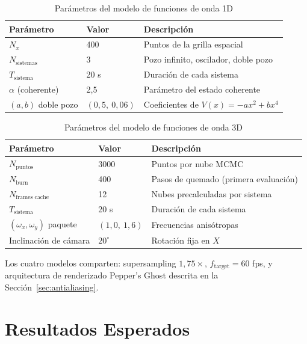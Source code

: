\documentclass[12pt, a4paper]{article}
\begin{document}
\begin{table}[H]
  \centering
  \caption{Parámetros del modelo de funciones de onda 1D}
  \begin{tabular}{lll}
    \toprule
    Parámetro & Valor & Descripción \\
    \midrule
    $N_x$              & 400  & Puntos de la grilla espacial \\
    $N_{\text{sistemas}}$ & 3 & Pozo infinito, oscilador, doble pozo \\
    $T_{\text{sistema}}$  & 20 s & Duración de cada sistema \\
    $\alpha$ (coherente)  & 2,5 & Parámetro del estado coherente \\
    $(a,b)$ doble pozo    & $(0{,}5,\ 0{,}06)$ & Coeficientes de $V(x)=-ax^2+bx^4$ \\
    \bottomrule
  \end{tabular}
  \label{tab:parametros_onda1d}
\end{table}

\begin{table}[H]
  \centering
  \caption{Parámetros del modelo de funciones de onda 3D}
  \begin{tabular}{lll}
    \toprule
    Parámetro & Valor & Descripción \\
    \midrule
    $N_{\text{puntos}}$      & 3000 & Puntos por nube MCMC \\
    $N_{\text{burn}}$        & 400  & Pasos de quemado (primera evaluación) \\
    $N_{\text{frames cache}}$ & 12  & Nubes precalculadas por sistema \\
    $T_{\text{sistema}}$     & 20 s & Duración de cada sistema \\
    $(\omega_x,\omega_y)$ paquete & $(1{,}0,\ 1{,}6)$ & Frecuencias anisótropas \\
    Inclinación de cámara    & $20^\circ$ & Rotación fija en $X$ \\
    \bottomrule
  \end{tabular}
  \label{tab:parametros_onda3d}
\end{table}

Los cuatro modelos comparten: supersampling $1{,}75\times$,
$f_{\text{target}}=60$ fps, y arquitectura de renderizado Pepper's
Ghost descrita en la Sección~\ref{sec:antialiasing}.

\section{Resultados Esperados}
\end{document}
